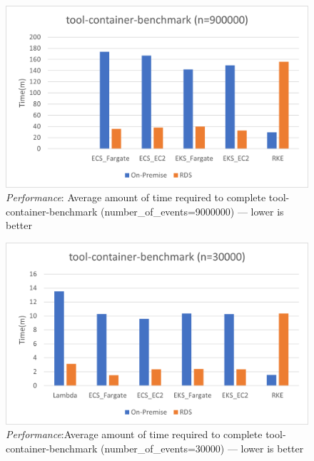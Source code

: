 \begin{figure}[hp]
  \includegraphics{images/perf-tcb_default.png}
  \caption{\emph{Performance}: Average amount of time required to complete tool-container-benchmark (number\_of\_events=9000000) --- lower is better}
  \label{fig:perf_tcb_default}
\end{figure}

\begin{figure}[hp]
  \includegraphics{images/perf-tcb_30000.png}
  \caption{\emph{Performance}:Average amount of time required to complete tool-container-benchmark (number\_of\_events=30000) --- lower is better}
  \label{fig:perf_tcb_30000}
\end{figure}

